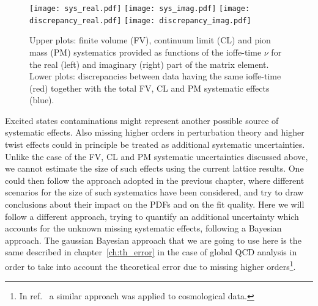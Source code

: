 \begin{figure}[h!]
    \centering
    \texttt{[image: sys\_real.pdf]}  
    \texttt{[image: sys\_imag.pdf]}
    \texttt{[image: discrepancy\_real.pdf]}  
    \texttt{[image: discrepancy\_imag.pdf]}
\caption{Upper plots: finite volume (FV), continuum limit (CL) and pion mass (PM) systematics provided 
as functions of the ioffe-time $\nu$ for the real (left) and imaginary (right) part 
of the matrix element. Lower plots: discrepancies between data having the same ioffe-time (red)
together with the total FV, CL and PM systematic effects (blue).}
\label{fig:sys}
\end{figure}

%
Excited states contaminations might represent another possible source of systematic effects. 
Also missing higher orders in perturbation theory and higher twist effects could in principle be treated
as additional systematic uncertainties. 
Unlike the case of the FV, CL and PM systematic uncertainties discussed above, we cannot estimate
the size of such effects using the current lattice results. 
One could then follow the approach adopted in the previous chapter,
where different scenarios for the size of such systematics have been considered, and try to draw conclusions about their
impact on the PDFs and on the fit quality. 
Here we will follow a different approach, trying to quantify an additional uncertainty which accounts for the 
unknown missing systematic effects, following a Bayesian approach.
The gaussian Bayesian approach that we are going to use here is the same 
described in chapter~\ref{ch:th_error} in the case of global QCD analysis in order to take into account 
the theoretical error due to missing higher orders\footnote{In ref.~\cite{Bernal:2018cxc} a similar approach was applied 
to cosmological data.}.

